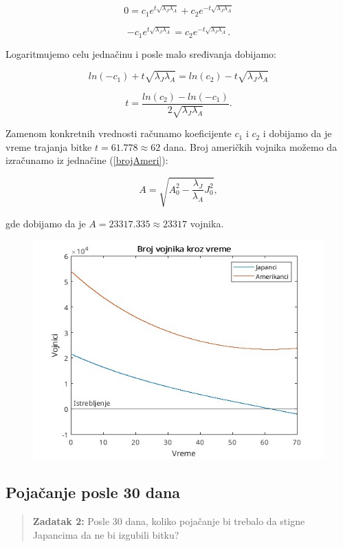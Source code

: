 \documentclass{article}
\newcommand{\laj}{\sqrt{\lambda_J\lambda_A}}
\begin{document}
\[
  0 = c_1 e^{t \laj} + c_2 e^{-t \laj}
\]

\[
  -c_1 e^{t \laj} = c_2 e^{-t \laj}.
\]

Logaritmujemo celu jednačinu i posle malo sređivanja dobijamo:

\[
  ln(-c_1) + t\laj= ln(c_2) - t\laj
\]

\[
  t = \frac{ln(c_2) - ln(-c_1)}{2\laj} .
\]

Zamenom konkretnih vrednosti računamo koeficijente \(c_1\) i \(c_2\) i dobijamo da je vreme trajanja bitke \(t = 61.778 \approx 62\) dana.
Broj američkih vojnika možemo da izračunamo iz jednačine (\ref{brojAmeri}): 

\[
  A = \sqrt{A_{0}^2 - \frac{\lambda_J}{\lambda_A}J_0^2},
\]

gde dobijamo da je \(A =23 317.335 \approx 23 317\) vojnika.


\begin{figure}[htbp]
    \center
    \includegraphics[scale=0.6]{img/bitka.jpg}
\end{figure}

\subsection{Pojačanje posle 30 dana}

\vspace{2mm}
\begin{quote}
\textbf{Zadatak 2:}
  Posle 30 dana, koliko pojačanje bi trebalo da stigne Japancima da ne bi
  izgubili bitku?
\end{quote}
\end{document}
